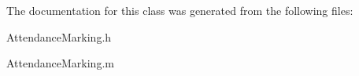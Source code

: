 The documentation for this class was generated from the following files\+:\begin{DoxyCompactItemize}
\item 
Attendance\+Marking.\+h\item 
Attendance\+Marking.\+m\end{DoxyCompactItemize}
